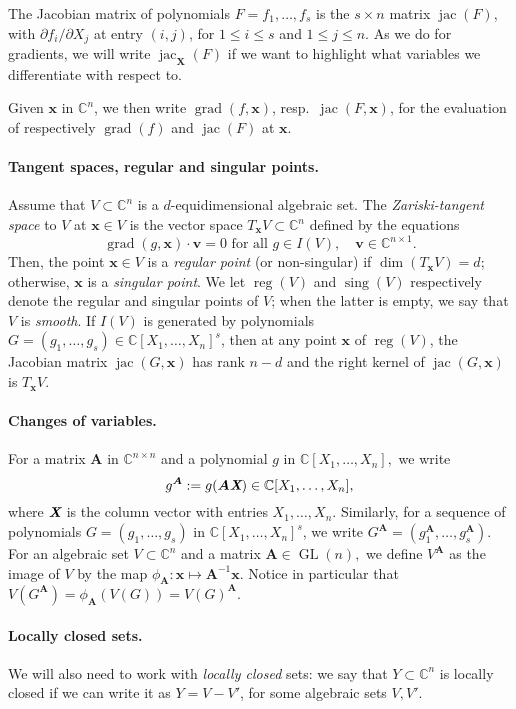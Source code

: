 \documentclass[12pt]{article}
\def\Xb{\textit{\textbf{X}}}
\def\mA{{\bm A}}
\def\xb{{\bm x}}
\DeclareMathOperator{\GL}{GL}
\DeclareMathOperator{\sing}{sing}
\DeclareMathOperator{\jac}{jac}
\DeclareMathOperator{\grad}{grad}
\DeclareMathOperator{\reg}{reg}
\def\C{\mathbb{C}}
\begin{document}
The Jacobian matrix of polynomials $F=f_1,\dots,f_s$ is the $s \times
n$ matrix $\jac(F)$, with $\partial f_i/\partial X_j$ at entry
$(i,j)$, for $1\le i \le s$ and $1 \le j \le n$. As we do for
gradients, we will write $\jac_{\bm X}(F)$ if we want to highlight
what variables we differentiate with respect to.

Given $\xb$ in $\C^n$, we then write $\grad(f,\xb)$, resp.\ $\jac(F,
\xb)$, for the evaluation of respectively $\grad(f)$ and $\jac(F)$ 
at $\xb$.

\paragraph*{Tangent spaces, regular and singular points.}
Assume that $V \subset \C^n$ is a $d$-equidimen\-sional algebraic
set. The \textit{Zariski-tangent space} to $V$ at $\xb \in V$ is the
vector space $T_{\xb}V \subset \C^n$ defined by the equations
\[
\grad (g,\xb) \cdot \bm v = 0 \text{~for all $g \in I(V)$}, \quad \bm
v \in \C^{n \times 1}.
\] 
Then, the point $\xb \in V$ is a \textit{regular point} (or
non-singular) if $\dim (T_{\xb}V) = d$; otherwise, $\xb$ is a
\textit{singular point}. We let $\reg(V)$ and $\sing(V)$ respectively
denote the regular and singular points of $V$; when the latter is
empty, we say that $V$ is \textit{smooth}. If $I(V)$ is generated by
polynomials $G=(g_1,\hdots,g_s) \in \C[X_1,\hdots,X_n]^s$, then at any
point $\xb$ of $\reg(V)$, the Jacobian matrix $\jac(G,\xb)$ has rank
$n - d$ and the right kernel of $\jac(G,\xb)$ is $T_{\xb}V.$

\paragraph*{Changes of variables.}
For a matrix $\mA$ in $\C^{n\times n}$ and a polynomial $g$ in
$\C[X_1,\hdots,X_n],$ we write \[g^\mA:=g(\mA \Xb) \in
\C[X_1,\dots,X_n],\] where $\Xb$ is the column vector with entries
$X_1,\dots,X_n$. Similarly, for a sequence of polynomials
$G=(g_1,\hdots,g_s)$ in $\C[X_1,\hdots,X_n]^s$, we write $G^{\mA} =
\left(g_1^{\mA},\hdots,g_s^{\mA}\right).$ For an algebraic set $V
\subset \C^n$ and a matrix $\mA \in \GL(n),$ we define $V^{\mA}$ as
the image of $V$ by the map $\phi_{\mA} : \xb \mapsto \mA^{-1}\xb.$
 Notice in particular that
$V(G^{\mA}) = \phi_{\mA}(V(G)) = V(G)^{\mA}. $

\paragraph*{Locally closed sets.}
We will also need to work with {\em locally closed} sets: we say that
$Y \subset \C^n$ is locally closed if we can write it as $Y=V-V'$, for
some algebraic sets $V,V'$.
\end{document}
